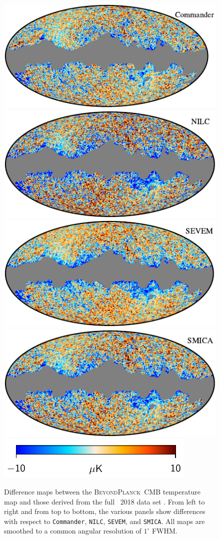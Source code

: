 \documentclass[twocolumn]{aa}
\def\commander{\texttt{Commander}}
\def\nilc{\texttt{NILC}}
\def\sevem{\texttt{SEVEM}}
\def\smica{\texttt{SMICA}}
\newcommand{\BP}{\textsc{BeyondPlanck}}
\begin{document}
\begin{figure}
  \center
  \includegraphics[width=0.47\linewidth]{figs/BP_cmb_diff_commander_v2_I_DIFF_w8_n1024_masked_nodip_c-planck.pdf}
  \includegraphics[width=0.47\linewidth]{figs/BP_cmb_diff_nilc_v2_I_DIFF_w8_n1024_masked_nodip_c-planck.pdf}\\
  \includegraphics[width=0.47\linewidth]{figs/BP_cmb_diff_sevem_v2_I_DIFF_w8_n1024_masked_nodip_c-planck.pdf}
  \includegraphics[width=0.47\linewidth]{figs/BP_cmb_diff_smica_v2_I_DIFF_w8_n1024_masked_nodip_c-planck.pdf}\\
  \includegraphics[width=0.34\linewidth]{figs/colourbar_10uK.pdf}
  \caption{Difference maps between the \BP\ CMB temperature map and
    those derived from the full \Planck\ 2018 data set
    \citep{planck2016-l04}. From left to right and from top to bottom,
    the various panels show differences with respect to \commander,
    \nilc, \sevem, and \smica. All maps are smoothed to a common
    angular resolution of $1^{\circ}$ FWHM.}\label{fig:cmb_diff}
\end{figure}
\end{document}
